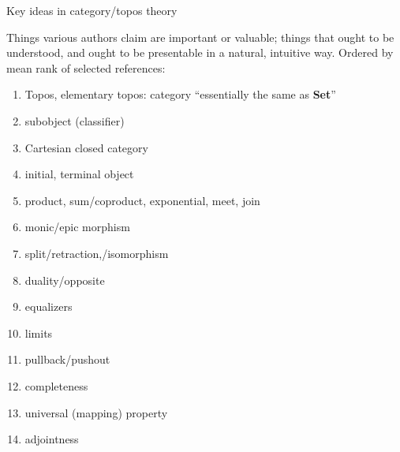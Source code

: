 \begin{plSection}{Key ideas in category/topos theory}
\label{sec:Key-ideas}
  
Things various authors claim are important or valuable;
things that ought to be understood,
and ought to be presentable in a natural, intuitive way.
Ordered by mean rank of selected references:
\begin{enumerate}
  \item Topos, elementary topos: 
  category ``essentially the same as \textbf{Set}''
  \item subobject (classifier)
  \item Cartesian closed category
  \item initial, terminal object
  \item product, sum/coproduct, exponential, meet, join
  \item monic/epic morphism
  \item split/retraction,/isomorphism
  \item duality/opposite
  \item equalizers
  \item limits
  \item pullback/pushout
  \item completeness
  \item universal (mapping) property
  \item adjointness
\end{enumerate}

\end{plSection}%
